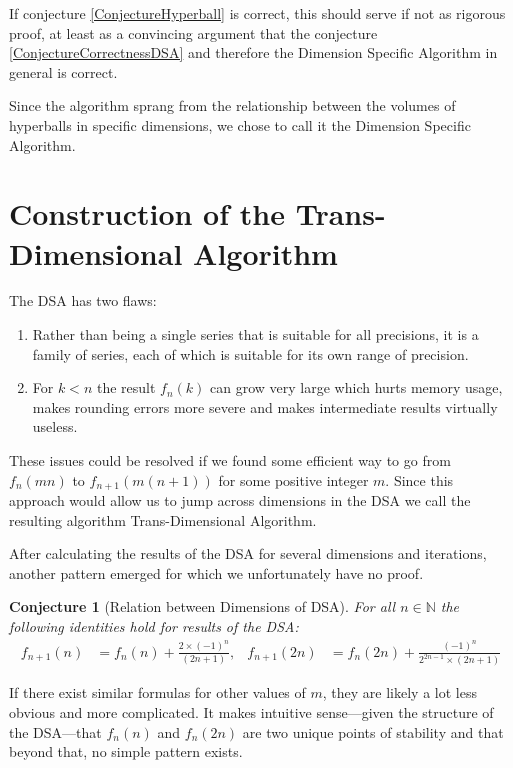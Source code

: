 \documentclass[a4paper,11pt]{scrartcl}
\newcounter{theoremcounter}
\theoremstyle{definition}
\theoremstyle{plain}
\newtheorem{myconjecture}[theoremcounter]{Conjecture}
\theoremstyle{remark}
\begin{document}
If conjecture \ref{ConjectureHyperball} is correct, this should serve if not as rigorous proof, at least as a convincing argument that the conjecture \ref{ConjectureCorrectnessDSA} and therefore the Dimension Specific Algorithm in general is correct.

Since the algorithm sprang from the relationship between the volumes of hyperballs in specific dimensions, we chose to call it the Dimension Specific Algorithm.

\section{Construction of the Trans-Dimensional Algorithm}

The DSA has two flaws:
\begin{enumerate}
\item Rather than being a single series that is suitable for all precisions, it is a family of series, each of which is suitable for its own range of precision.
\item For $k < n$ the result $f_n(k)$ can grow very large which hurts memory usage, makes rounding errors more severe and makes intermediate results virtually useless.
\end{enumerate}

These issues could be resolved if we found some efficient way to go from $f_n(mn)$ to $f_{n+1}(m(n+1))$ for some positive integer $m$.
Since this approach would allow us to jump across dimensions in the DSA we call the resulting algorithm Trans-Dimensional Algorithm.

After calculating the results of the DSA for several dimensions and iterations, another pattern emerged for which we unfortunately have no proof.

\begin{myconjecture}[Relation between Dimensions of DSA]
\label{ConjectureDsaToTda}
For all $n \in \mathbb{N}$ the following identities hold for results of the DSA:
\begin{align*}
f_{n+1}(n) &= f_n(n) + \frac{2 \times (-1)^{n}}{(2n + 1)},
&f_{n+1}(2n) &= f_n(2n) + \frac{(-1)^{n}}{2^{2n-1} \times (2n + 1)}
\end{align*}
\end{myconjecture}

If there exist similar formulas for other values of $m$, they are likely a lot less obvious and more complicated.
It makes intuitive sense---given the structure of the DSA---that $f_n(n)$ and $f_n(2n)$ are two unique points of stability and that beyond that, no simple pattern exists.
\end{document}
